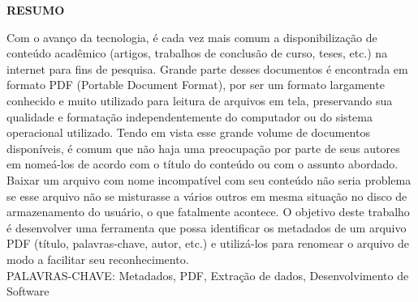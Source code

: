 \begin{center}
\textbf{RESUMO}
\end{center}
\singlespacing

\noindent Com o avanço da tecnologia, é cada vez mais comum a disponibilização de conteúdo acadêmico (artigos, trabalhos de conclusão de curso, teses, etc.) na internet para fins de pesquisa. Grande parte desses documentos é encontrada em formato PDF (Portable Document Format), por ser um formato largamente conhecido e muito utilizado para leitura de arquivos em tela, preservando sua qualidade e formatação independentemente do computador ou do sistema operacional utilizado.
  Tendo em vista esse grande volume de documentos disponíveis, é comum que não haja uma preocupação por parte de seus autores em nomeá-los de acordo com o título do conteúdo ou com o assunto abordado. Baixar um arquivo com nome incompatível com seu conteúdo não seria problema se esse arquivo não se misturasse a vários outros em mesma situação no disco de armazenamento do usuário, o que fatalmente acontece.
	O objetivo deste trabalho é desenvolver uma ferramenta que possa identificar os metadados de um arquivo PDF (título, palavras-chave, autor, etc.) e utilizá-los para renomear o arquivo de modo a facilitar seu reconhecimento.
 \\

\noindent PALAVRAS-CHAVE: Metadados, PDF, Extração de dados, Desenvolvimento de Software
